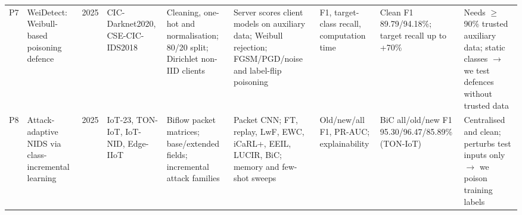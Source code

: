 \documentclass[10pt,a4paper]{article}
\begin{document}
\begin{landscape}
\begin{table}[p]
\begin{tabularx}{\linewidth}{L{0.6cm}L{2.9cm}L{0.6cm}Y Y Y Y Y Y}
P7 & WeiDetect: Weibull-based poisoning defence \cite{wei} & 2025 & CIC-Darknet2020, CSE-CIC-IDS2018 & Cleaning, one-hot and normalisation; 80/20 split; Dirichlet non-IID clients & Server scores client models on auxiliary data; Weibull rejection; FGSM/PGD/noise and label-flip poisoning & F1, target-class recall, computation time & Clean F1 89.79/94.18\%; target recall up to +70\% & Needs $\ge$90\% trusted auxiliary data; static classes $\rightarrow$ we test defences without trusted data\\[3pt]
P8 & Attack-adaptive NIDS via class-incremental learning \cite{cerasuolo} & 2025 & IoT-23, TON-IoT, IoT-NID, Edge-IIoT & Biflow packet matrices; base/extended fields; incremental attack families & Packet CNN; FT, replay, LwF, EWC, iCaRL+, EEIL, LUCIR, BiC; memory and few-shot sweeps & Old/new/all F1, PR-AUC; explainability & BiC all/old/new F1 95.30/96.47/85.89\% (TON-IoT) & Centralised and clean; perturbs test inputs only $\rightarrow$ we poison training labels\\
\bottomrule
\end{tabularx}
\end{table}


\end{landscape}
\end{document}
